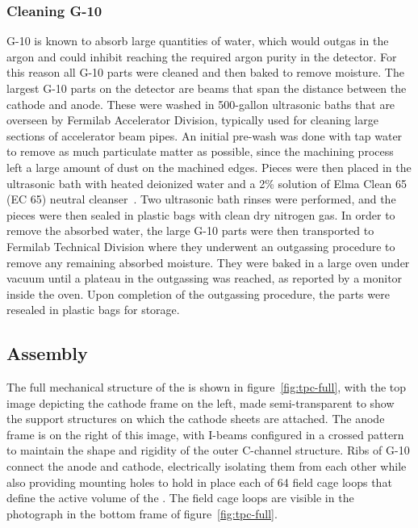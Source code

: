 \subsubsection{Cleaning G-10}

G-10 is known to absorb large quantities of water, which would outgas in the argon and could inhibit reaching the required argon purity in the detector. For this reason all G-10 parts were cleaned and then baked to remove moisture. The largest G-10 parts on the detector are beams that span the distance between the cathode and anode. These were washed in 500-gallon ultrasonic baths that are overseen by Fermilab Accelerator Division, typically used for cleaning large sections of accelerator beam pipes. An initial pre-wash was done with tap water to remove as much particulate matter as possible, since the machining process left a large amount of dust on the machined edges.  Pieces were then placed in the ultrasonic bath with heated deionized water and a 2\% solution of Elma Clean 65 (EC 65) neutral cleanser~\cite{elmaclean}. Two ultrasonic bath rinses were performed, and the pieces were then sealed in plastic bags with clean dry nitrogen gas. In order to remove the absorbed water, the large G-10 parts were then transported to Fermilab Technical Division where they underwent an outgassing procedure to remove any remaining absorbed moisture.  They were baked in a large oven under vacuum until a plateau in the outgassing was reached, as reported by a monitor inside the oven. Upon completion of the outgassing procedure, the parts were resealed in plastic bags for storage.

\subsection{Assembly}


The full mechanical structure of the \lartpc is shown in figure~\ref{fig:tpc-full}, with the top image depicting the cathode frame on the left, made semi-transparent to show the support structures on which the cathode sheets are attached. The anode frame is on the right of this image, with I-beams configured in a crossed pattern to maintain the shape and rigidity of the outer C-channel structure. Ribs of G-10 connect the anode and cathode, electrically isolating them from each other while also providing mounting holes to hold in place each of 64 field cage loops that define the active volume of the \lartpc.  The field cage loops are visible in the photograph in the bottom frame of figure~\ref{fig:tpc-full}.

